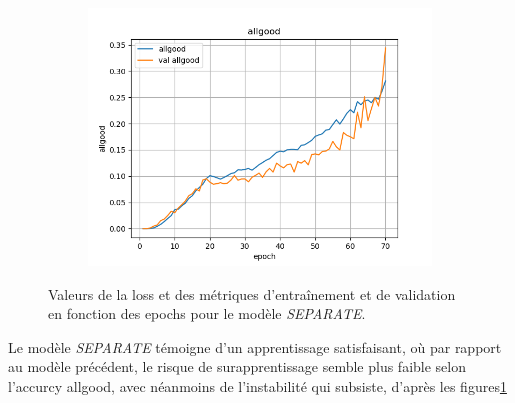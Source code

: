 \documentclass[a4paper]{article}
\begin{document}
\begin{figure}[H]
\begin{subfigure}{0.32\textwidth}
        \includegraphics[width=\linewidth]{../logs/separate/allgood.png}
    \end{subfigure}
    \caption{Valeurs de la loss et des métriques d'entraînement et de validation en fonction des epochs 
            pour le modèle \textit{SEPARATE}.}
    \label{fig: results separate}
\end{figure}

Le modèle \textit{SEPARATE} témoigne d'un apprentissage satisfaisant, où par rapport au modèle précédent, le risque de surapprentissage semble plus faible selon l'accurcy allgood, avec néanmoins de l'instabilité qui subsiste, d'après les figures\ref{fig: results separate}
\end{document}
